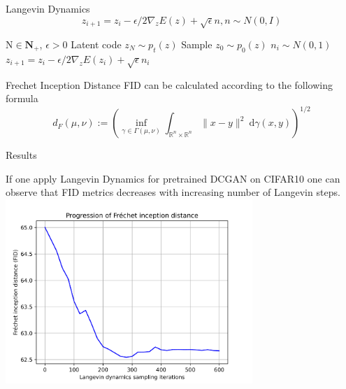 \documentclass[xcolor=dvipsnames]{beamer}
\begin{document}
    \begin{frame}{Langevin Dynamics}
        \begin{equation*}
            z_{i+1} = z_i - \epsilon/2 \nabla_z E(z) + \sqrt{\epsilon} n, n \sim N(0, I)
        \end{equation*}

        \begin{center}
         \begin{algorithmic}
             N$\in \mathbf{N}_+$, $\epsilon > 0$ 
             Latent code $z_N \sim p_t(z)$
            \STATE Sample $z_0 \sim p_0(z)$   
            \STATE $n_i \sim N(0, 1)$
            \STATE $z_{i + 1} = z_i - \epsilon/2 \nabla_z E(z_i) + \sqrt{\epsilon} n_i$
            \ENDFOR
         \end{algorithmic}
        \end{center}
    \end{frame}
    \begin{frame}{Frechet Inception Distance}
        FID can be calculated according to the following formula
        \begin{equation*}
            d_F(\mu, \nu):=\left(\inf _{\gamma \in \Gamma(\mu, \nu)} \int_{\mathbb{R}^n \times \mathbb{R}^n}\|x-y\|^2 \mathrm{~d} \gamma(x, y)\right)^{1 / 2}
        \end{equation*}
    \end{frame}
    \begin{frame}{\hypertarget{frame:res-energy}{Results}} 
        \begin{center}
            If one apply Langevin Dynamics for pretrained DCGAN on CIFAR10 one can observe 
            that FID metrics decreases with increasing number of Langevin steps.
            \includegraphics[width=0.7\textwidth]{pics/FID_EBMGAN.png}
        \end{center}
    \end{frame}
\end{document}

